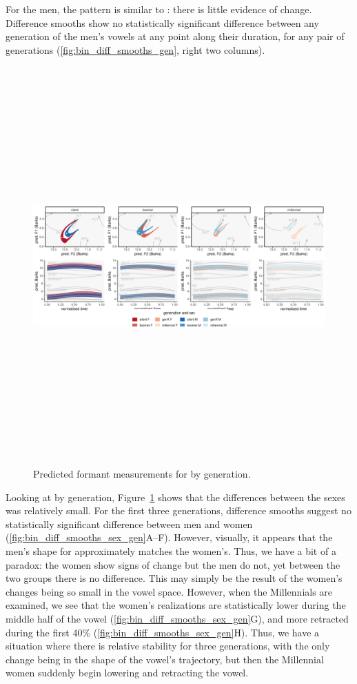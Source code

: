 For the men, the pattern is similar to \bit: there is little evidence of change. Difference smooths show no statistically significant difference between any generation of the men's vowels at any point along their duration, for any pair of generations (\ref{fig:bin_diff_smooths_gen}, right two columns).

\begin{figure}[p]
	\centering
	\includegraphics[angle = 90, origin = c, height = 6in]{Figures/BIN/BIN_sex_panel_plot_wide.pdf}
	\caption[Predicted formant measurements for \bin by generation.]{Predicted formant measurements for \bin by generation.}
	\label{fig:BIN_sex_panel_plot_wide}
\end{figure}

Looking at \bin by generation, Figure~\ref{fig:BIN_sex_panel_plot_wide} shows that the differences between the sexes was relatively small. For the first three generations, difference smooths suggest no statistically significant difference between men and women (\ref{fig:bin_diff_smooths_sex_gen}A--F). However, visually, it appears that the men's shape for \bin approximately matches the women's. Thus, we have a bit of a paradox: the women show signs of change but the men do not, yet between the two groups there is no difference. This may simply be the result of the women's changes being so small in the vowel space. However, when the Millennials are examined, we see that the women's realizations are statistically lower during the middle half of the vowel (\ref{fig:bin_diff_smooths_sex_gen}G), and more retracted during the first 40\% (\ref{fig:bin_diff_smooths_sex_gen}H). Thus, we have a situation where there is relative stability for three generations, with the only change being in the shape of the vowel's trajectory, but then the Millennial women suddenly begin lowering and retracting the vowel.

